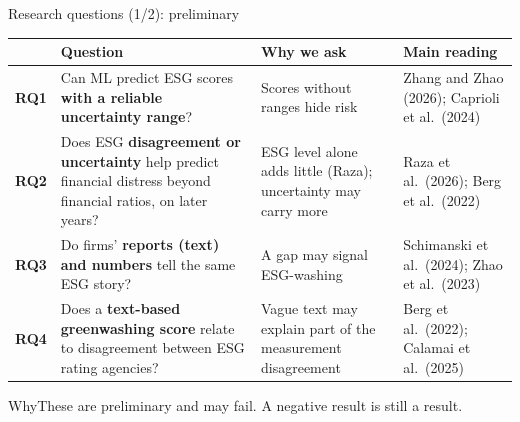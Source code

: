 \documentclass[aspectratio=169,11pt]{beamer}
\newcommand{\why}[1]{\vspace{2pt}\begin{block}{Why}#1\end{block}}
\begin{document}
\begin{frame}[t]{Research questions (1/2): preliminary}
\scriptsize
\begin{tabular}{@{}p{0.9cm}p{5.0cm}p{3.7cm}p{3.5cm}@{}}
\toprule
\rowcolor{softteal} & \textbf{Question} & \textbf{Why we ask} & \textbf{Main reading} \\
\midrule
\textbf{\color{teal}RQ1} & Can ML predict ESG scores \textbf{with a reliable uncertainty range}? & Scores without ranges hide risk & Zhang and Zhao (2026); Caprioli et al.\ (2024) \\
\textbf{\color{amber!85!black}RQ2} & Does ESG \textbf{disagreement or uncertainty} help predict financial distress beyond financial ratios, on later years? & ESG level alone adds little (Raza); uncertainty may carry more & Raza et al.\ (2026); Berg et al.\ (2022) \\
\textbf{\color{plum}RQ3} & Do firms' \textbf{reports (text) and numbers} tell the same ESG story? & A gap may signal ESG-washing & Schimanski et al.\ (2024); Zhao et al.\ (2023) \\
\textbf{\color{plum}RQ4} & Does a \textbf{text-based greenwashing score} relate to disagreement between ESG rating agencies? & Vague text may explain part of the measurement disagreement & Berg et al.\ (2022); Calamai et al.\ (2025) \\
\bottomrule
\end{tabular}
\why{These are preliminary and may fail. A negative result is still a result.}
\end{frame}
\end{document}
